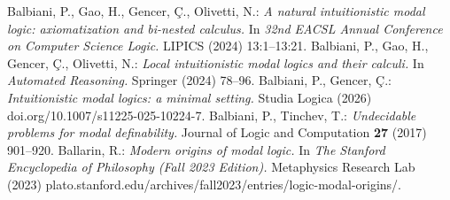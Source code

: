 \documentclass[draft]{article}
\begin{document}
\begin{thebibliography}{}
%
%
%
%
%
%
%
%
Balbiani, P., Gao, H., Gencer, \c{C}., Olivetti, N.:
{\it A natural intuitionistic modal logic: axiomatization and bi-nested calculus.}
In {\it 32nd EACSL Annual Conference on Computer Science Logic.}
LIPICS (2024) 13:1--13:21.
%
%
Balbiani, P., Gao, H., Gencer, \c{C}., Olivetti, N.:
{\it Local intuitionistic modal logics and their calculi.}
In {\it Automated Reasoning.}
Springer (2024) 78--96.
%
%
Balbiani, P., Gencer, \c{C}.:
{\it Intuitionistic modal logics: a minimal setting.}
Studia Logica (2026) doi.org/10.1007/s11225-025-10224-7.
%
%
%
%
%
%
Balbiani, P., Tinchev, T.:
{\it Undecidable problems for modal definability.}
Journal of Logic and Computation {\bf 27} (2017) 901--920.
%
%
%
%
Ballarin, R.:
{\it Modern origins of modal logic.}
In {\it The Stanford Encyclopedia of Philosophy (Fall 2023 Edition).}
Metaphysics Research Lab (2023) plato.stanford.edu/archives/fall2023/entries/logic-modal-origins/.
%
%
%
%

\end{thebibliography}
\end{document}
